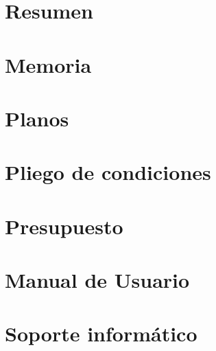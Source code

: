 \clearemptydoublepage

\tableofcontents
\listoffigures
\listoftables
\setlength{\parskip}{2mm}

\newpage
\newpage

\clearemptydoublepage
\chapter{Resumen}
\newpage
\clearemptydoublepage

\clearemptydoublepage

\chapter{Memoria}
\newpage
\clearemptydoublepage

\clearemptydoublepage

\chapter{Planos}
\newpage
\clearemptydoublepage

\clearemptydoublepage

\chapter{Pliego de condiciones}
\newpage
\clearemptydoublepage

\clearemptydoublepage

\chapter{Presupuesto}
\newpage
\clearemptydoublepage

\clearemptydoublepage

\chapter{Manual de Usuario}
\newpage
\clearemptydoublepage

\clearemptydoublepage

\chapter{Soporte informático}
\newpage
\clearemptydoublepage

\clearemptydoublepage

%

